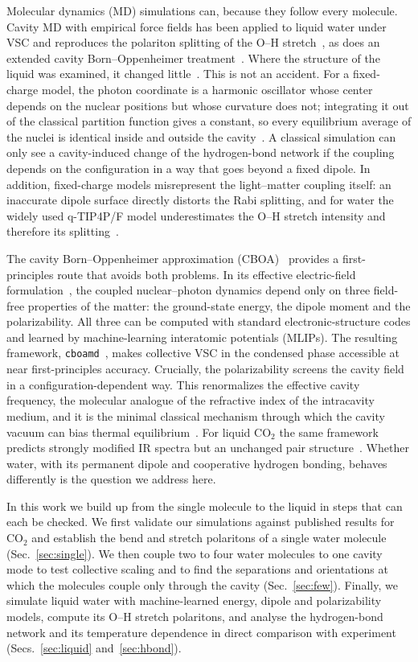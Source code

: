 \documentclass[aps,prb,reprint,superscriptaddress,nofootinbib,floatfix]{revtex4-2}
\begin{document}
Molecular dynamics (MD) simulations can, because they follow every molecule. Cavity MD
with empirical force fields has been applied to liquid water under VSC and reproduces
the polariton splitting of the O--H stretch~\cite{Li2020PNAS,Lieberherr2023}, as does
an extended cavity Born--Oppenheimer treatment~\cite{Bowles2025}. Where the structure
of the liquid was examined, it changed little~\cite{Li2020PNAS,Bowles2025}. This is not an accident. For a
fixed-charge model, the photon coordinate is a harmonic oscillator whose center depends
on the nuclear positions but whose curvature does not; integrating it out of the
classical partition function gives a constant, so every equilibrium average of the
nuclei is identical inside and outside the cavity~\cite{Li2020JCP}. A classical
simulation can only see a cavity-induced change of the hydrogen-bond network if the
coupling depends on the configuration in a way that goes beyond a fixed dipole. In
addition, fixed-charge models misrepresent the light--matter coupling itself: an
inaccurate dipole surface directly distorts the Rabi splitting, and for water the
widely used q-TIP4P/F model underestimates the O--H stretch intensity and therefore its
splitting~\cite{Lieberherr2023}.

The cavity Born--Oppenheimer approximation (CBOA)~\cite{Flick2017} provides a
first-principles route that avoids both problems. In its effective electric-field
formulation~\cite{Bonini2024}, the coupled nuclear--photon dynamics depend only on
three field-free properties of the matter: the ground-state energy, the dipole moment
and the polarizability. All three can be computed with standard electronic-structure
codes and learned by machine-learning interatomic potentials (MLIPs). The resulting
framework, \texttt{cboamd}~\cite{Li2026cboamd}, makes collective VSC in the condensed
phase accessible at near first-principles accuracy. Crucially, the polarizability
screens the cavity field in a configuration-dependent way. This renormalizes the
effective cavity frequency, the molecular analogue of the refractive index of the
intracavity medium, and it is the minimal classical mechanism through which the cavity
vacuum can bias thermal equilibrium~\cite{Li2026cboamd}. For liquid CO$_2$ the same
framework predicts strongly modified IR spectra but an unchanged pair
structure~\cite{Li2026cboamd}. Whether water, with its permanent dipole and
cooperative hydrogen bonding, behaves differently is the question we address here.

In this work we build up from the single molecule to the liquid in steps that can each be checked.
We first validate our simulations against published results for CO$_2$ and establish
the bend and stretch polaritons of a single water molecule
(Sec.~\ref{sec:single}). We then couple two to four water molecules to one cavity mode
to test collective scaling and to find the separations and orientations at which the
molecules couple only through the cavity (Sec.~\ref{sec:few}). Finally, we simulate
liquid water with machine-learned energy, dipole and polarizability models, compute
its O--H stretch polaritons, and analyse the hydrogen-bond network and its temperature
dependence in direct comparison with experiment (Secs.~\ref{sec:liquid}
and~\ref{sec:hbond}).
\end{document}
